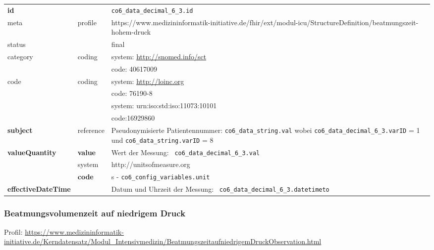 \begin{longtable}{|l|l|p{7.5cm}|}
	\hline
	\rowcolor{lightgray} \multicolumn{3}{|l|}{Data Mapping (inhaltlich)} \\ \hline
	\textbf{id} &  & \texttt{co6\_data\_decimal\_6\_3.id} \\ \hline
	meta & profile & https://www.medizininformatik-initiative.de/fhir/ext/modul-icu/StructureDefinition/beatmungszeit-hohem-druck \\ \hline 
	status &  & final   \\ \hline 
	category & coding & system: \url{http://snomed.info/sct} \\
	\cline{3-3}
	& & code: 40617009 \\ \hline
	code & coding & system: \url{http://loinc.org} \\ 
	\cline{3-3} 
	&  & code: 76190-8 \\ 
	\cline{3-3} 
	&  & system: urn:iso:std:iso:11073:10101 \\ 
	\cline{3-3} 
	&  & code:16929860  \\ \hline
	\textbf{subject} & reference & Pseudonymisierte Patientennummer: \texttt{co6\_data\_string.val} wobei \texttt{co6\_data\_decimal\_6\_3.varID} = 1 und \texttt{co6\_data\_string.varID} = 8 \\ \hline
	\textbf{valueQuantity}  & \textbf{value} & Wert der Messung: \texttt{
		co6\_data\_decimal\_6\_3.val} \\
	\cline{2-3}
	& system & http://unitsofmeasure.org \\
	\cline{2-3}
	& \textbf{code} & s - \texttt{co6\_config\_variables.unit}
	\\ \hline
	\textbf{effectiveDateTime}  & & Datum und Uhrzeit der Messung: \texttt{
		co6\_data\_decimal\_6\_3.datetimeto} \\
	\hline
\end{longtable}

\subsubsection{Beatmungsvolumenzeit auf niedrigem Druck} 
Profil: \url{https://www.medizininformatik-initiative.de/Kerndatensatz/Modul_Intensivmedizin/BeatmungszeitaufniedrigemDruckObservation.html}

